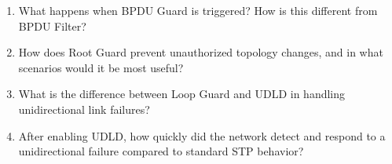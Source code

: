 \documentclass[a4paper]{book}
\begin{document}
\begin{enumerate}
	\item What happens when BPDU Guard is triggered? How is this different from BPDU Filter?
	\item How does Root Guard prevent unauthorized topology changes, and in what scenarios would it be most useful?
	\item What is the difference between Loop Guard and UDLD in handling unidirectional link failures?
	\item After enabling UDLD, how quickly did the network detect and respond to a unidirectional failure compared to standard STP behavior?
\end{enumerate}
\end{document}
